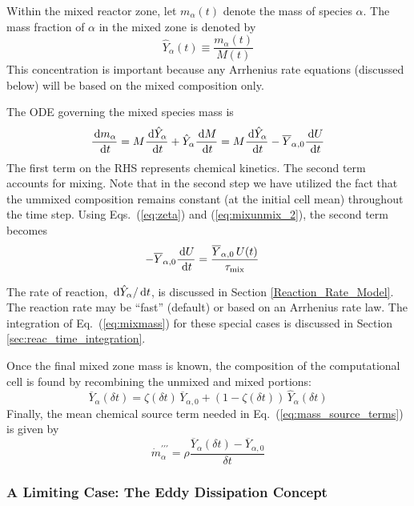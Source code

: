 Within the mixed reactor zone, let $m_\alpha(t)$ denote the mass of species $\alpha$.  The mass fraction of $\alpha$ in the mixed zone is denoted by
\begin{equation}\label{eq:mass_fraction_mixed}
\hat{Y}_{\alpha}(t)\equiv\frac{m_{\alpha}(t)}{M(t)}
\end{equation}
This concentration is important because any Arrhenius rate equations (discussed below) will be based on the mixed composition only.

The ODE governing the mixed species mass is
\begin{equation}\label{eq:mixmass}
\frac{\,\mathrm{d} m_{\alpha}}{\,\mathrm{d} t} = M \frac{\,\mathrm{d} \hat{Y}_\alpha}{\,\mathrm{d} t} + \hat{Y}_\alpha \frac{\,\mathrm{d} M}{\,\mathrm{d} t} = M \frac{\,\mathrm{d} \hat{Y}_\alpha}{\,\mathrm{d} t} - \overline{Y}_{\alpha,0} \frac{\,\mathrm{d} U}{\,\mathrm{d} t}
\end{equation}
The first term on the RHS represents chemical kinetics.  The second term accounts for mixing.  Note that in the second step we have utilized the fact that the ummixed composition remains constant (at the initial cell mean) throughout the time step. Using Eqs.~(\ref{eq:zeta}) and (\ref{eq:mixunmix_2}), the second term becomes
\begin{align}
\label{eq:mixingstep}
-\overline{Y}_{\alpha,0} \frac{\,\mathrm{d} U}{\,\mathrm{d} t} &= \frac{\overline{Y}_{\alpha,0} \, U(t) }{\tau_{\rm mix}}
\end{align}

The rate of reaction, $\,\mathrm{d} \hat{Y}_\alpha/\,\mathrm{d} t$, is discussed in Section \ref{Reaction_Rate_Model}. The reaction rate may be ``fast'' (default) or based on an Arrhenius rate law.  The integration of Eq.~(\ref{eq:mixmass}) for these special cases is discussed in Section \ref{sec:reac_time_integration}. 

Once the final mixed zone mass is known, the composition of the computational cell is found by recombining the unmixed and mixed portions:
\begin{equation}
\label{eq:final_comp}
\overline{Y}_{\alpha}(\delta t)= \zeta(\delta t) \, \overline{Y}_{\alpha,0} + (1-\zeta(\delta t)) \, \hat{Y}_{\alpha}(\delta t)
\end{equation}
Finally, the mean chemical source term needed in Eq.~(\ref{eq:mass_source_terms}) is given by
\begin{equation}
\label{mass_prod_rate}
\dot{m}^{\prime\prime\prime}_{\alpha} = \rho \frac{\overline{Y}_{\alpha}(\delta t) - \overline{Y}_{\alpha,0}}{\delta t}
\end{equation}

\subsubsection{A Limiting Case: The Eddy Dissipation Concept}

